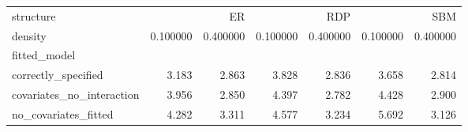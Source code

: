 \begin{tabular}{lrrrrrr}
\toprule
structure & \multicolumn{2}{r}{ER} & \multicolumn{2}{r}{RDP} & \multicolumn{2}{r}{SBM} \\
density & 0.100000 & 0.400000 & 0.100000 & 0.400000 & 0.100000 & 0.400000 \\
fitted_model &  &  &  &  &  &  \\
\midrule
correctly_specified & 3.183 & 2.863 & 3.828 & 2.836 & 3.658 & 2.814 \\
covariates_no_interaction & 3.956 & 2.850 & 4.397 & 2.782 & 4.428 & 2.900 \\
no_covariates_fitted & 4.282 & 3.311 & 4.577 & 3.234 & 5.692 & 3.126 \\
\bottomrule
\end{tabular}
